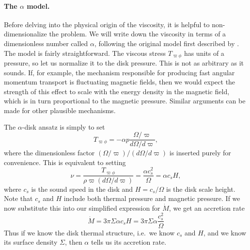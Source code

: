 \paragraph{The $\alpha$ model.}

Before delving into the physical origin of the viscosity, it is helpful to non-dimensionalize the problem. We will write down the viscosity in terms of a dimensionless number called $\alpha$, following the original model first described by \citet{shakura73a}. The model is fairly straightforward. The viscous stress  $T_{\varpi\phi}$ has units of a pressure, so let us normalize it to the disk pressure. This is not as arbitrary as it sounds. If, for example, the mechanism responsible for producing fast angular momentum transport is fluctuating magnetic fields, then we would expect the strength of this effect to scale with the energy density in the magnetic field, which is in turn proportional to the magnetic pressure. Similar arguments can be made for other plausible mechanisms.

The $\alpha$-disk ansatz is simply to set
\begin{equation}
T_{\varpi\phi} = -\alpha p \frac{\Omega/\varpi}{d\Omega/d\varpi},
\end{equation}
where the dimensionless factor $(\Omega/\varpi)/(d\Omega/d\varpi)$ is inserted purely for convenience. This is equivalent to setting
\begin{equation}
\nu = \frac{T_{\varpi\phi}}{\rho \varpi (d\Omega/d\varpi)} = \frac{\alpha c_s^2}{\Omega} = \alpha c_s H,
\end{equation}
where $c_s$ is the sound speed in the disk and $H = c_s/\Omega$ is the disk scale height. Note that $c_s$ and $H$ include both thermal pressure and magnetic pressure. If we now substitute this into our simplified expression for $\dot{M}$, we get an accretion rate
\begin{equation}
\label{eq:mdot_steady}
\dot{M} = 3\pi \Sigma \alpha c_s H = 3\pi \Sigma \alpha \frac{c_s^2}{\Omega}
\end{equation}
Thus if we know the disk thermal structure, i.e.\ we know $c_s$ and $H$, and we know its surface density $\Sigma$, then $\alpha$ tells us its accretion rate.

